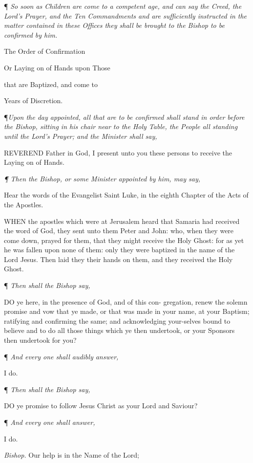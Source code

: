 ¶
\emph{So soon as Children are come to a competent age, and can say the Creed,
the Lord’s Prayer, and the Ten Commandments and are sufficiently
instructed in the matter contained in these Offices they shall be brought
to the Bishop to be confirmed by him.}

The
Order of Confirmation

Or Laying on of Hands upon Those 

that are Baptized, and come to 

Years of Discretion.

¶\emph{Upon the day appointed, all that are to be confirmed shall stand in
order before the Bishop, sitting in his chair near to the Holy Table,
the People all standing until the Lord's Prayer; and the Minister shall
say,}

REVEREND
Father in God, I present unto you these persons to receive the Laying
on of Hands.

\emph{¶ Then the Bishop, or some Minister
appointed by him, may say,}

Hear the words of the Evangelist Saint
Luke, in the eighth Chapter of the Acts of the Apostles.

WHEN the apostles which
were at Jerusalem heard that Samaria had received the word of God, they
sent unto them Peter and John: who, when they were come down, prayed for
them, that they might receive the Holy Ghost: for as yet he was fallen
upon none of them: only they were baptized in the name of the Lord Jesus.
Then laid they their hands on them, and they received the Holy Ghost.

¶ \emph{Then shall the Bishop say,}

DO ye here, in the presence
of God, and of this con- gregation, renew the solemn promise and vow that
ye made, or that was made in your name, at your Baptism; ratifying and
confirming the same; and acknowledging your-selves bound to believe and
to do all those things which ye then undertook, or your Sponsors then
undertook for you?

¶
\emph{And every one shall audibly answer,}

I do.

¶ \emph{Then shall the Bishop say,}

DO ye promise to follow
Jesus Christ as your Lord and Saviour?

¶
\emph{And every one shall answer,}

I do.

\emph{Bishop.} Our help is in the
Name of the Lord;

